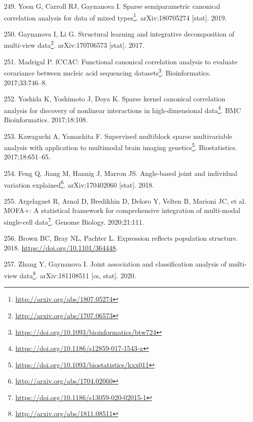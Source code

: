 \documentclass[
  a4paper,
]{book}
\DeclareRobustCommand{\href}[2]{#2\footnote{\url{#1}}}
\newlength{\cslhangindent}
\newlength{\cslentryspacingunit} %
\newenvironment{CSLReferences}[2] %
 {%
  \setlength{\parindent}{0pt}
  \ifodd #1
  \let\oldpar\par
  \def\par{\hangindent=\cslhangindent\oldpar}
  \fi
  \setlength{\parskip}{#2\cslentryspacingunit}
 }%
 {}
\begin{document}
\begin{CSLReferences}{0}{0}
\leavevmode{}%
249. Yoon G, Carroll RJ, Gaynanova I. \href{http://arxiv.org/abs/1807.05274}{Sparse semiparametric canonical correlation analysis for data of mixed types}. arXiv:180705274 {[}stat{]}. 2019.

\leavevmode{}%
250. Gaynanova I, Li G. \href{http://arxiv.org/abs/1707.06573}{Structural learning and integrative decomposition of multi-view data}. arXiv:170706573 {[}stat{]}. 2017.

\leavevmode{}%
251. Madrigal P. \href{https://doi.org/10.1093/bioinformatics/btw724}{fCCAC: Functional canonical correlation analysis to evaluate covariance between nucleic acid sequencing datasets}. Bioinformatics. 2017;33:746--8.

\leavevmode{}%
252. Yoshida K, Yoshimoto J, Doya K. \href{https://doi.org/10.1186/s12859-017-1543-x}{Sparse kernel canonical correlation analysis for discovery of nonlinear interactions in high-dimensional data}. BMC Bioinformatics. 2017;18:108.

\leavevmode{}%
253. Kawaguchi A, Yamashita F. \href{https://doi.org/10.1093/biostatistics/kxx011}{Supervised multiblock sparse multivariable analysis with application to multimodal brain imaging genetics}. Biostatistics. 2017;18:651--65.

\leavevmode{}%
254. Feng Q, Jiang M, Hannig J, Marron JS. \href{http://arxiv.org/abs/1704.02060}{Angle-based joint and individual variation explained}. arXiv:170402060 {[}stat{]}. 2018.

\leavevmode{}%
255. Argelaguet R, Arnol D, Bredikhin D, Deloro Y, Velten B, Marioni JC, et al. \href{https://doi.org/10.1186/s13059-020-02015-1}{MOFA+: A statistical framework for comprehensive integration of multi-modal single-cell data}. Genome Biology. 2020;21:111.

\leavevmode{}%
256. Brown BC, Bray NL, Pachter L. Expression reflects population structure. 2018. \url{https://doi.org/10.1101/364448}.

\leavevmode{}%
257. Zhang Y, Gaynanova I. \href{http://arxiv.org/abs/1811.08511}{Joint association and classification analysis of multi-view data}. arXiv:181108511 {[}cs, stat{]}. 2020.


\end{CSLReferences}
\end{document}
